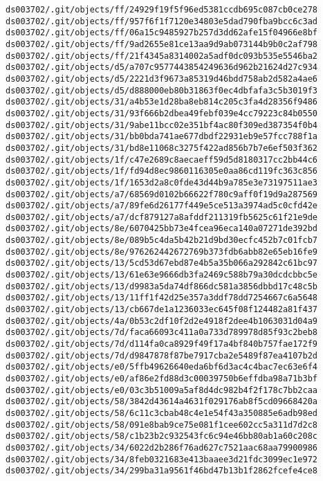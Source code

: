 \documentclass[11pt]{article}
\begin{document}
\begin{Verbatim}[commandchars=\\\{\}]
ds003702/.git/objects/ff/24929f19f5f96ed5381ccdb695c087cb0ce278
ds003702/.git/objects/ff/957f6f1f7120e34803e5dad790fba9bcc6c3ad
ds003702/.git/objects/ff/06a15c9485927b257d3dd62afe15f04966e8bf
ds003702/.git/objects/ff/9ad2655e81ce13aa9d9ab073144b9b0c2af798
ds003702/.git/objects/ff/21f4345a8314002a5adf0dc093b535e5546ba2
ds003702/.git/objects/d5/a707c9577443854249636d962b21624d27c934
ds003702/.git/objects/d5/2221d3f9673a85319d46bdd758ab2d582a4ae6
ds003702/.git/objects/d5/d888000eb80b31863f0ec4dbfafa3c5b3019f3
ds003702/.git/objects/31/a4b53e1d28ba8eb814c205c3fa4d28356f9486
ds003702/.git/objects/31/93f666b2dbea49febf039e4cc79223c84b0550
ds003702/.git/objects/31/9abe11bcc02e351bf4ac80f309ed387354f0b4
ds003702/.git/objects/31/bb0bda741ae677dbdf22931eb9e57fcc788f1a
ds003702/.git/objects/31/bd8e11068c3275f422ad856b7b7e6ef503f362
ds003702/.git/objects/1f/c47e2689c8aecaeff59d5d8180317cc2bb44c6
ds003702/.git/objects/1f/fd94d8ec9860116305e0aa86cd119fc363c856
ds003702/.git/objects/1f/1653d2a8c0fde43d44b9a785e3e73197511ae3
ds003702/.git/objects/a7/68569d0102b66622f780c9aff0f19d9a287569
ds003702/.git/objects/a7/89fe6d26177f449e5ce513a3974ad5c0cfd42e
ds003702/.git/objects/a7/dcf879127a8afddf211319fb5625c61f21e9de
ds003702/.git/objects/8e/6070425bb73e4fcea96eca140a07271de392bd
ds003702/.git/objects/8e/089b5c4da5b42b21d9bd30ecfc452b7c01fcb7
ds003702/.git/objects/8e/976262442672769b373fdb6abb82e65eb16fe9
ds003702/.git/objects/13/5cd53d67ebd87e4b5a35b066a292842c61bc97
ds003702/.git/objects/13/61e63e9666db3fa2469c588b79a30dcdcbbc5e
ds003702/.git/objects/13/d9983a5da74df866dc581a3856dbbd17c48c5b
ds003702/.git/objects/13/11ff1f42d25e357a3ddf78dd7254667c6a5648
ds003702/.git/objects/13/cb667de1a1236033ec645f08f124482a81f437
ds003702/.git/objects/4a/0b53c2df10f2d2e4918f2dee4b1063031d04a9
ds003702/.git/objects/7d/faca66093c411a0a733d789978d85f93c2beb8
ds003702/.git/objects/7d/d114fa0ca8929f49f17a4bf840b757fae172f9
ds003702/.git/objects/7d/d9847878f87be7917cba2e5489f87ea4107b2d
ds003702/.git/objects/e0/5ffb49626640eda6bf6d3ac4c4bac7ec63e6f4
ds003702/.git/objects/e0/af86e2fd88d3c00039750b6effdba98a71b3bf
ds003702/.git/objects/e0/03c3b51009a5af8d4dc982b4f2f178c7bb2caa
ds003702/.git/objects/58/3842d43614a4631f029176ab8f5cd09668420a
ds003702/.git/objects/58/6c11c3cbab48c4e1e54f43a350885e6adb98ed
ds003702/.git/objects/58/091e8bab9ce75e081f1cee602cc5a311d7d2c8
ds003702/.git/objects/58/c1b23b2c932543fc6c94e46bb80ab1a60c208c
ds003702/.git/objects/34/6022d2b286f76ad627c7521aac68aa79900986
ds003702/.git/objects/34/8feb0321683e413baaee3d21fdc3099ec1e972
ds003702/.git/objects/34/299ba31a9561f46bd47b13b1f2862fcefe4ce8

\end{Verbatim}
\end{document}
